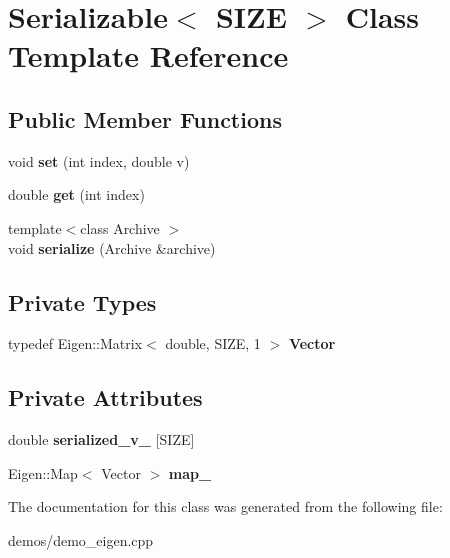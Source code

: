 \hypertarget{classSerializable}{}\section{Serializable$<$ S\+I\+ZE $>$ Class Template Reference}
\label{classSerializable}
\subsection*{Public Member Functions}
\begin{DoxyCompactItemize}
\item 
void {\bfseries set} (int index, double v)\hypertarget{classSerializable_a2db7fcfa31d5802fa8c889c41a2295b9}{}\label{classSerializable_a2db7fcfa31d5802fa8c889c41a2295b9}

\item 
double {\bfseries get} (int index)\hypertarget{classSerializable_a5f762ded2b44a416b362f6dfd9cf9976}{}\label{classSerializable_a5f762ded2b44a416b362f6dfd9cf9976}

\item 
{\footnotesize template$<$class Archive $>$ }\\void {\bfseries serialize} (Archive \&archive)\hypertarget{classSerializable_a442df4ac2ecad585776f620405b8ce0e}{}\label{classSerializable_a442df4ac2ecad585776f620405b8ce0e}

\end{DoxyCompactItemize}
\subsection*{Private Types}
\begin{DoxyCompactItemize}
\item 
typedef Eigen\+::\+Matrix$<$ double, S\+I\+ZE, 1 $>$ {\bfseries Vector}\hypertarget{classSerializable_a41015ba50b004943be3691039863377e}{}\label{classSerializable_a41015ba50b004943be3691039863377e}

\end{DoxyCompactItemize}
\subsection*{Private Attributes}
\begin{DoxyCompactItemize}
\item 
double {\bfseries serialized\+\_\+v\+\_\+} \mbox{[}S\+I\+ZE\mbox{]}\hypertarget{classSerializable_abb77ae537c25b7941e041c3239f0085d}{}\label{classSerializable_abb77ae537c25b7941e041c3239f0085d}

\item 
Eigen\+::\+Map$<$ Vector $>$ {\bfseries map\+\_\+}\hypertarget{classSerializable_af836042e597c021ae7cbb1699c4de2e9}{}\label{classSerializable_af836042e597c021ae7cbb1699c4de2e9}

\end{DoxyCompactItemize}


The documentation for this class was generated from the following file\+:\begin{DoxyCompactItemize}
\item 
demos/demo\+\_\+eigen.\+cpp\end{DoxyCompactItemize}
